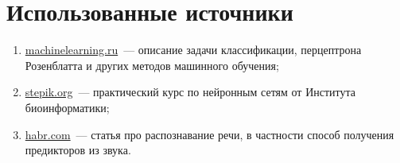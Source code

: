 \section{Использованные источники}
	\begin{enumerate}
		\item \href{http://www.machinelearning.ru/wiki/index.php}{machinelearning.ru}~--- описание задачи классификации,
				перцептрона Розенблатта и других методов машинного обучения;
		\item \href{https://stepik.org/course/401}{stepik.org}~--- практический курс по нейронным
				сетям от Института биоинформатики;
		\item \href{https://habr.com/post/226143}{habr.com}~--- статья про распознавание речи,
				в частности способ получения предикторов из звука.
	\end{enumerate}